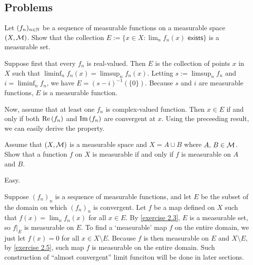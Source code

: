 \subsection*{Problems}

\begin{prob}[Exercise 2.3]\label{exercise 2.3}
    Let $(f_n)_{n\in{\mathbb{N}}}$ be a sequence of measurable functions on a measurable space $(X, {\mathcal{M}})$.
    Show that the collection $E:=\{x\in X:\lim_n f_n(x)\textsf{ exists}\}$ is a measurable set.
\end{prob}
\begin{sol}
    Suppose first that every $f_n$ is real-valued.
    Then $E$ is the collection of points $x$ in $X$ such that $\liminf_n f_n(x)=\limsup_n f_n(x)$.
    Letting $s:=\limsup_n f_n$ and $i=\liminf_n f_n$, we have $E=(s-i)^{-1}(\{0\})$.
    Because $s$ and $i$ are measurable functions, $E$ is a measurable function.

    Now, assume that at least one $f_n$ is complex-valued function.
    Then $x\in E$ if and only if both $\textrm{Re}\left({f_n}\right)$ and $\textrm{Im}\left({f_n}\right)$ are convergent at $x$.
    Using the preceeding result, we can easily derive the property.
\end{sol}

\begin{prob}[Exercise 2.5]\label{exercise 2.5}
    Assume that $(X, {\mathcal{M}})$ is a measurable space and $X=A\cup B$ where $A,\,B\in{\mathcal{M}}$.
    Show that a function $f$ on $X$ is measurable if and only if $f$ is measurable on $A$ and $B$.
\end{prob}
\begin{sol}
    Easy.
\end{sol}

\begin{rmk}
    Suppose $(f_n)_n$ is a sequence of measurable functions, and let $E$ be the subset of the domain on which $(f_n)_n$ is convergent.
    Let $f$ be a map defined on $X$ such that $f(x)=\lim_n f_n(x)$ for all $x\in E$.
    By \cref{exercise 2.3}, $E$ is a measurable set, so $f|_E$ is measurable on $E$.
    To find a `measurable' map $f$ on the entire domain, we just let $f(x)=0$ for all $x\in X\setminus E$.
    Because $f$ is then measurable on $E$ and $X\setminus E$, by \cref{exercise 2.5}, such map $f$ is measurable on the entire domain.
    Such construction of ``almost convergent'' limit funciton will be done in later sections.
\end{rmk}


